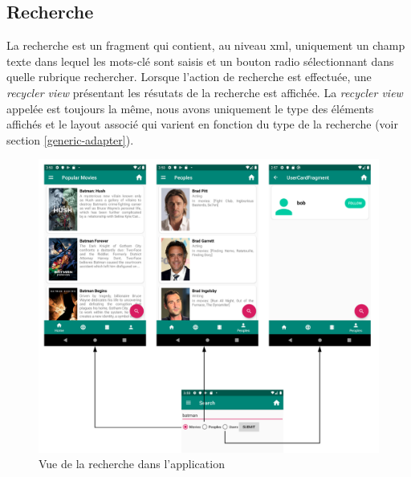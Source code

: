 \subsection{Recherche}
La recherche est un fragment qui contient, au niveau \acrshort{xml}, uniquement un champ texte dans lequel les mots-clé sont saisis et un bouton radio sélectionnant dans quelle rubrique rechercher.
Lorsque l'action de recherche est effectuée, une \textit{recycler view} présentant les résutats de la recherche est affichée. La \textit{recycler view} appelée est toujours la même, nous avons uniquement le type des éléments affichés et le layout associé qui varient en fonction du type de la recherche (voir section \ref{generic-adapter}).
\begin{figure}
    \begin{center}
        \includegraphics[width=1\textwidth]{img/schemas/Search.png}
    \end{center}
    \caption{Vue de la recherche dans l'application}
    \label{search}
\end{figure}


